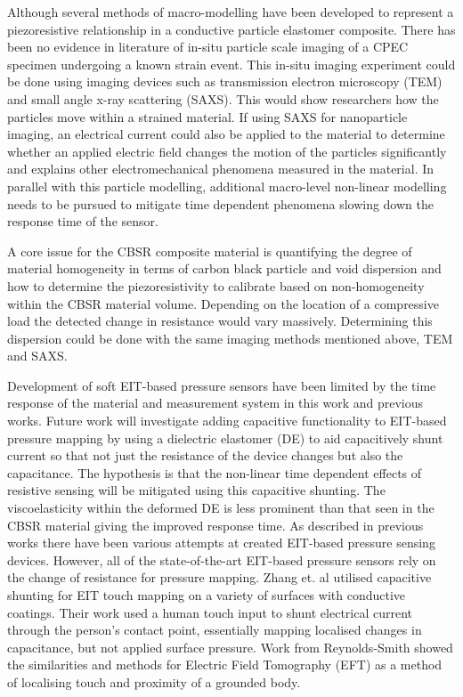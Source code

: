 Although several methods of macro-modelling have been developed to represent a piezoresistive relationship in a conductive particle elastomer composite. There has been no evidence in literature of in-situ particle scale imaging of a CPEC specimen undergoing a known strain event. This in-situ imaging experiment could be done using imaging devices such as transmission electron microscopy (TEM) and small angle x-ray scattering (SAXS). This would show researchers how the particles move within a strained material. If using SAXS for nanoparticle imaging, an electrical current could also be applied to the material to determine whether an applied electric field changes the motion of the particles significantly and explains other electromechanical phenomena measured in the material. In parallel with this particle modelling, additional macro-level non-linear modelling needs to be pursued to mitigate time dependent phenomena slowing down the response time of the sensor.

A core issue for the CBSR composite material is quantifying the degree of material homogeneity in terms of carbon black particle and void dispersion and how to determine the piezoresistivity to calibrate based on non-homogeneity within the CBSR material volume. Depending on the location of a compressive load the detected change in resistance would vary massively. Determining this dispersion could be done with the same imaging methods mentioned above, TEM and SAXS.

Development of soft EIT-based pressure sensors have been limited by the time response of the material and measurement system in this work and previous works. Future work will investigate adding capacitive functionality to EIT-based pressure mapping by using a dielectric elastomer (DE) to aid capacitively shunt current so that not just the resistance of the device changes but also the capacitance. The hypothesis is that the non-linear time dependent effects of resistive sensing will be mitigated using this capacitive shunting. The viscoelasticity within the deformed DE is less prominent than that seen in the CBSR material giving the improved response time. As described in previous works \cite{Ellingham2024} there have been various attempts at created EIT-based pressure sensing devices. However, all of the state-of-the-art EIT-based pressure sensors rely on the change of resistance for pressure mapping. Zhang et. al \cite{Zhang2017} utilised capacitive shunting for EIT touch mapping on a variety of surfaces with conductive coatings. Their work used a human touch input to shunt electrical current through the person's contact point, essentially mapping localised changes in capacitance, but not applied surface pressure. Work from Reynolds-Smith \cite{Reynoldssmith1995,Reynoldssmith1999} showed the similarities and methods for Electric Field Tomography (EFT) as a method of localising touch and proximity of a grounded body. 

